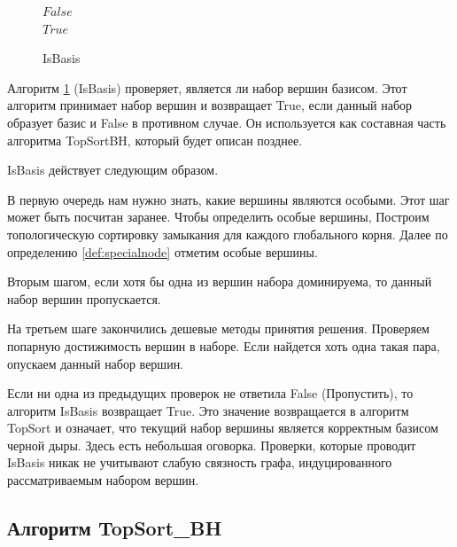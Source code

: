 \documentclass[12pt,a4paper,oneside,openany]{article}
\theoremstyle{definition}
\theoremstyle{lemma}
\theoremstyle{remark}
\begin{document}
\begin{figure}[H]
\begin{center}
\begin{algorithm}[H]
{{{{                                    }
                                }
                            }
			}
                         {
                             {
                                \Return $False$ \\
                            }
                        }
                        \Return $True$
			\label{alg:isbasis}
			\caption{IsBasis}
		\end{algorithm}
	\end{center}
\end{figure}
\linespread{1.5}

Алгоритм \ref{alg:isbasis} (IsBasis)  проверяет, является ли набор вершин базисом.
Этот алгоритм принимает набор вершин и возвращает True, если данный набор образует базис и False в противном случае.
Он используется как составная часть алгоритма TopSortBH, который будет описан позднее.

IsBasis действует следующим образом.

В первую очередь нам нужно знать, какие вершины являются особыми.
Этот шаг может быть посчитан заранее. Чтобы определить особые вершины,
Построим топологическую сортировку замыкания для каждого глобального корня.
Далее по определению \ref{def:specialnode} отметим особые вершины.

Вторым шагом, если хотя бы одна из вершин набора доминируема, то данный набор вершин пропускается.

На третьем шаге закончились дешевые методы принятия решения.
Проверяем попарную достижимость вершин в наборе.
Если найдется хоть одна такая пара, опускаем данный набор вершин.

Если ни одна из предыдущих проверок не ответила False (Пропустить), то алгоритм IsBasis возвращает True.
Это значение возвращается в алгоритм TopSort и означает, что текущий набор вершины является корректным базисом черной дыры.
Здесь есть небольшая оговорка. Проверки, которые проводит IsBasis никак не учитывают слабую связность
графа, индуцированного рассматриваемым набором вершин.

\subsection{Алгоритм TopSort\_BH}\label{subsec:topsortbh}
\end{document}
